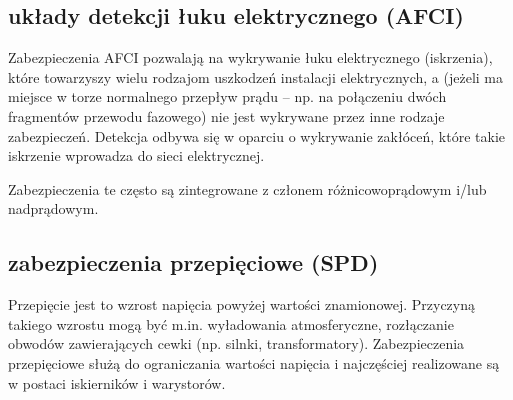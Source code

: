 \subsection{układy detekcji łuku elektrycznego (AFCI)}

Zabezpieczenia AFCI pozwalają na wykrywanie łuku elektrycznego (iskrzenia), które towarzyszy wielu rodzajom uszkodzeń instalacji elektrycznych,
	a (jeżeli ma miejsce w torze normalnego przepływ prądu – np. na połączeniu dwóch fragmentów przewodu fazowego) nie jest wykrywane przez inne rodzaje zabezpieczeń.
Detekcja odbywa się w oparciu o wykrywanie zakłóceń, które takie iskrzenie wprowadza do sieci elektrycznej.

Zabezpieczenia te często są zintegrowane z członem różnicowoprądowym i/lub nadprądowym.

\subsection{zabezpieczenia przepięciowe (SPD)}

Przepięcie jest to wzrost napięcia powyżej wartości znamionowej. Przyczyną takiego wzrostu mogą być m.in. wyładowania atmosferyczne, rozłączanie obwodów zawierających cewki (np. silnki, transformatory).
Zabezpieczenia przepięciowe służą do ograniczania wartości napięcia i najczęściej realizowane są w postaci iskierników i warystorów.


